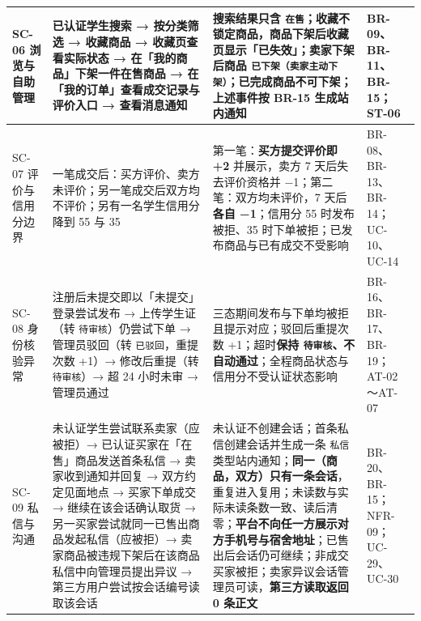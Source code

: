 \documentclass[12pt,a4paper]{ctexart}
\begin{document}
{\begin{longtable}{|p{1.50cm}|p{6.26cm}|p{6.02cm}|p{2.22cm}|}
\hline
SC-06 浏览与自助管理 & 已认证学生搜索 → 按分类筛选 → 收藏商品 → 收藏页查看实际状态 → 在「我的商品」下架一件在售商品 → 在「我的订单」查看成交记录与评价入口 → 查看消息通知 & 搜索结果只含 \texttt{在售}；收藏不锁定商品，商品下架后收藏页显示「已失效」；卖家下架后商品 \texttt{已下架（卖家主动下架）}；已完成商品不可下架；上述事件按 BR-15 生成站内通知 & BR-09、BR-11、BR-15；ST-06 \\
\hline
SC-07 评价与信用分边界 & 一笔成交后：买方评价、卖方未评价；另一笔成交后双方均不评价；另有一名学生信用分降到 55 与 35 & 第一笔：\textbf{买方提交评价即 +2} 并展示，卖方 7 天后失去评价资格并 −1；第二笔：双方均未评价，7 天后\textbf{各自 −1}；信用分 55 时发布被拒、35 时下单被拒；已发布商品与已有成交不受影响 & BR-08、BR-13、BR-14；UC-10、UC-14 \\
\hline
SC-08 身份核验异常 & 注册后未提交即以「未提交」登录尝试发布 → 上传学生证（转 \texttt{待审核}）仍尝试下单 → 管理员驳回（转 \texttt{已驳回}，重提次数 +1）→ 修改后重提（转 \texttt{待审核}）→ 超 24 小时未审 → 管理员通过 & 三态期间发布与下单均被拒且提示对应；驳回后重提次数 +1；超时\textbf{保持 \texttt{待审核}、不自动通过}；全程商品状态与信用分不受认证状态影响 & BR-16、BR-17、BR-19；AT-02～AT-07 \\
\hline
SC-09 私信与沟通 & 未认证学生尝试联系卖家（应被拒）→ 已认证买家在「在售」商品发送首条私信 → 卖家收到通知并回复 → 双方约定见面地点 → 买家下单成交 → 继续在该会话确认取货 → 另一买家尝试就同一已售出商品发起私信（应被拒）→ 卖家商品被违规下架后在该商品私信中向管理员提出异议 → 第三方用户尝试按会话编号读取该会话 & 未认证不创建会话；首条私信创建会话并生成一条 \texttt{私信} 类型站内通知；\textbf{同一（商品，双方）只有一条会话}，重复进入复用；未读数与实际未读条数一致、读后清零；\textbf{平台不向任一方展示对方手机号与宿舍地址}；已售出后会话仍可继续；非成交买家被拒；卖家异议会话管理员可读，\textbf{第三方读取返回 0 条正文} & BR-20、BR-15；NFR-09；UC-29、UC-30 \\
\hline
\end{longtable}
}
\end{document}
